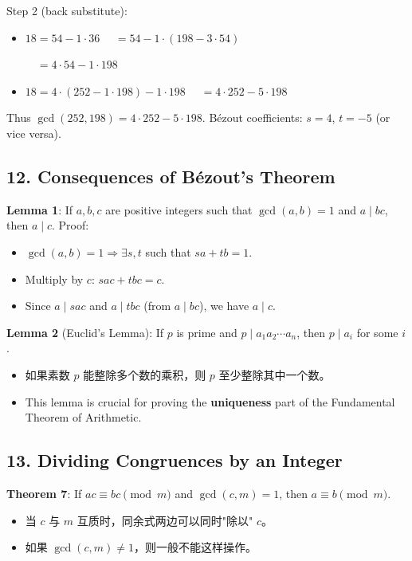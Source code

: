 \documentclass[10pt,a4paper,openany]{ctexbook}
\theoremstyle{definition}
\theoremstyle{remark}
\begin{document}
Step 2 (back substitute):
\begin{itemize}
\item $18 = 54 - 1 \cdot 36$
$\quad = 54 - 1 \cdot (198 - 3 \cdot 54)$

$\quad = 4 \cdot 54 - 1 \cdot 198$

\item $18 = 4 \cdot (252 - 1 \cdot 198) - 1 \cdot 198$
$\quad = 4 \cdot 252 - 5 \cdot 198$


\end{itemize}

Thus $\gcd(252, 198) = 4 \cdot 252 - 5 \cdot 198$.
B\'ezout coefficients: $s = 4$, $t = -5$ (or vice versa).
\vspace{-2pt}

\subsection{12. Consequences of B\'ezout's Theorem}

\textbf{Lemma 1}: If $a, b, c$ are positive integers such that $\gcd(a, b) = 1$ and $a \mid bc$, then $a \mid c$.
Proof:
\begin{itemize}
\item $\gcd(a, b) = 1 \Rightarrow \exists s, t$ such that $sa + tb = 1$.
\item Multiply by $c$: $sac + tbc = c$.
\item Since $a \mid sac$ and $a \mid tbc$ (from $a \mid bc$), we have $a \mid c$.

\end{itemize}

\textbf{Lemma 2} (Euclid's Lemma): If $p$ is prime and $p \mid a_1 a_2 \cdots a_n$, then $p \mid a_i$ for some $i$.
\begin{itemize}
\item 如果素数 $p$ 能整除多个数的乘积，则 $p$ 至少整除其中一个数。
\item This lemma is crucial for proving the \textbf{uniqueness} part of the Fundamental Theorem of Arithmetic.

\end{itemize}

\vspace{-2pt}

\subsection{13. Dividing Congruences by an Integer}

\textbf{Theorem 7}: If $ac \equiv bc \pmod{m}$ and $\gcd(c, m) = 1$, then $a \equiv b \pmod{m}$.
\begin{itemize}
\item 当 $c$ 与 $m$ 互质时，同余式两边可以同时"除以" $c$。
\item 如果 $\gcd(c, m) \neq 1$，则一般不能这样操作。

\end{itemize}
\end{document}
